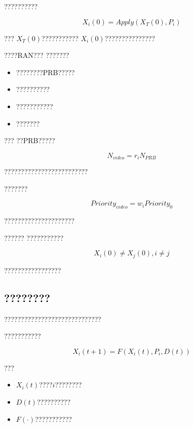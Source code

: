 ??????????

\begin{equation}
X_i(0)
=
Apply
(
X_T(0),
P_i
)
\end{equation}

???
$X_T(0)$???????????
$X_i(0)$???????????????


????RAN???
???????

\begin{itemize}
    \item ????????PRB?????
    \item ??????????
    \item ???????????
    \item ???????
\end{itemize}


???
??PRB?????

\begin{equation}
N_{video}
=
r_iN_{PRB}
\end{equation}

?????????????????????????


???????

\begin{equation}
Priority_{video}
=
w_iPriority_0
\end{equation}

?????????????????????


??????
???????????

\begin{equation}
X_i(0)
\neq
X_j(0),
i\neq j
\end{equation}

?????????????????



\subsection*{????????}

?????????????????????????????

???????????

\begin{equation}
X_i(t+1)
=
F
(
X_i(t),
P_i,
D(t)
)
\end{equation}

???

\begin{itemize}
    \item $X_i(t)$????$i$????????
    \item $D(t)$??????????
    \item $F(\cdot)$???????????
\end{itemize}


